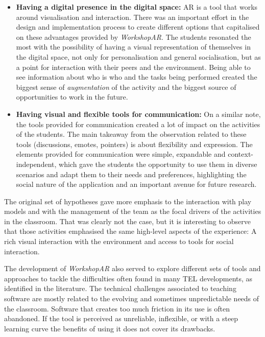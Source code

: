 \begin{itemize}
    All of these observations aligned very well with the original intention of the design and support the idea that \emph{a sense of immersion} in the context of \ac{AR} technologies
    include the physical space and many other elements outside the tool itself. This take on \ac{AR} creates an advantage when it is important to not lose focus of the context in which
    students are learning, or when the context is also helping achieve their learning goal. 
    \item \textbf{Having a digital presence in the digital space:} \ac{AR} is a tool that works around visualisation and interaction. There was an important effort in the design and
    implementation process to create different options that capitalised on these advantages provided by \emph{WorkshopAR}. The students resonated the most with the possibility of having a
    visual representation of themselves in the digital space, not only for personalisation and general socialisation, but as a point for interaction with their peers and the environment.
    Being able to see information about who is who and the tasks being performed created the biggest sense of \emph{augmentation} of the activity and the biggest source of opportunities to
    work in the future.
    \item \textbf{Having visual and flexible tools for communication:} On a similar note, the tools provided for communication created a lot of impact on the activities of the students. The
    main takeaway from the observation related to these tools (discussions, emotes, pointers) is about flexibility and expression. The elements provided for communication were simple,
    expandable and context-independent, which gave the students the opportunity to use them in diverse scenarios and adapt them to their needs and preferences, highlighting the social
    nature of the application and an important avenue for future research.
\end{itemize}

The original set of hypotheses gave more emphasis to the interaction with play models and with the management of the team as the focal drivers of the activities in the classroom. That was
clearly not the case, but it is interesting to observe that those activities emphasised the same high-level aspects of the experience: A rich visual interaction with the environment and
access to tools for social interaction.

The development of \emph{WorkshopAR} also served to explore different sets of tools and approaches to tackle the difficulties often found in many \ac{TEL} developments, as identified in
the literature. The technical challenges associated to teaching software are mostly related to the evolving and sometimes unpredictable needs of the classroom. Software that creates too
much friction in its use is often abandoned. If the tool is perceived as unreliable, inflexible, or with a steep learning curve the benefits of using it does not cover its drawbacks.

